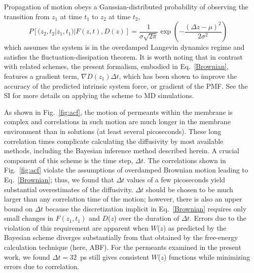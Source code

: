 %
Propagation of motion obeys a Gaussian-distributed probability of observing the 
transition from $z_1$ at time $t_1$ to $z_2$ at time $t_2$,
%
\begin{equation}
\label{eq:Gaussian}
P[(z_2, t_2 | z_1, t_1) | F(z,t), D(z)] =
\frac{1}{\sigma \sqrt{ 2 \pi}}
\exp \left(-\frac{(\Delta z - \mu)^2}{2 \sigma^2} \right) 
\end{equation}
%
which assumes the system is in the overdamped Langevin dynamics regime and satisfies the 
fluctuation-dissipation theorem.
It is worth noting that in contrast with related
schemes, the present formalism, embodied in Eq.~\ref{Brownian}, features 
a gradient term, $\nabla D(z_1) \Delta t$, which has been shown to improve 
the accuracy of the predicted intrinsic system force, or gradient of the PMF.
%
See the SI for more details on applying the scheme 
to MD simulations.

As shown in Fig.~\ref{fig:acf}, the motion of permeants within the membrane is complex and correlations in such motion are much longer in the membrane environment than in solutions (at least several picoseconds).
These long correlation times complicate calculating the diffusivity by most
available methods, including the Bayesian inference method described herein.
A crucial component of this scheme is the time step, $\Delta t$.
The correlations shown in Fig.~\ref{fig:acf} violate the assumptions of
overdamped Brownian motion leading to Eq.~\ref{Brownian}; thus, 
we found that $\Delta t$ values of a few picoseconds yield substantial overestimates of the diffusivity.
$\Delta t$ should be chosen to be much larger than any correlation
time of the motion; however, there is also an upper bound on $\Delta t$ because
the discretization implicit in Eq.~\ref{Brownian} requires
only small changes in $F(z_1, t_1)$ and $D$($z$) over the duration of $\Delta t$.
Errors due to the violation of this requirement are apparent when
$W$($z$) as predicted by the Bayesian scheme diverges substantially
from that obtained by the free-energy calculation technique
(here, ABF).
For the permeants examined in the present work,
we found $\Delta t=32$~ps still gives consistent $W$($z$)
functions while minimizing errors due to correlation.

